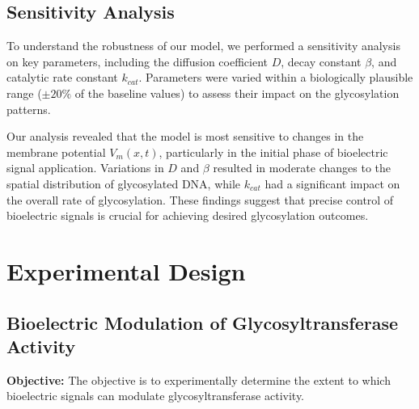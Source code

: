 \documentclass[12pt]{article}
\begin{document}
\subsection{Sensitivity Analysis}
To understand the robustness of our model, we performed a sensitivity analysis on key parameters, including the diffusion coefficient \(D\), decay constant \(\beta\), and catalytic rate constant \(k_{cat}\). Parameters were varied within a biologically plausible range (\(\pm 20\%\) of the baseline values) to assess their impact on the glycosylation patterns.

Our analysis revealed that the model is most sensitive to changes in the membrane potential \(V_m(x,t)\), particularly in the initial phase of bioelectric signal application. Variations in \(D\) and \(\beta\) resulted in moderate changes to the spatial distribution of glycosylated DNA, while \(k_{cat}\) had a significant impact on the overall rate of glycosylation. These findings suggest that precise control of bioelectric signals is crucial for achieving desired glycosylation outcomes.

\section{Experimental Design}

\subsection{Bioelectric Modulation of Glycosyltransferase Activity}

\textbf{Objective:} The objective is to experimentally determine the extent to which bioelectric signals can modulate glycosyltransferase activity.
\end{document}
